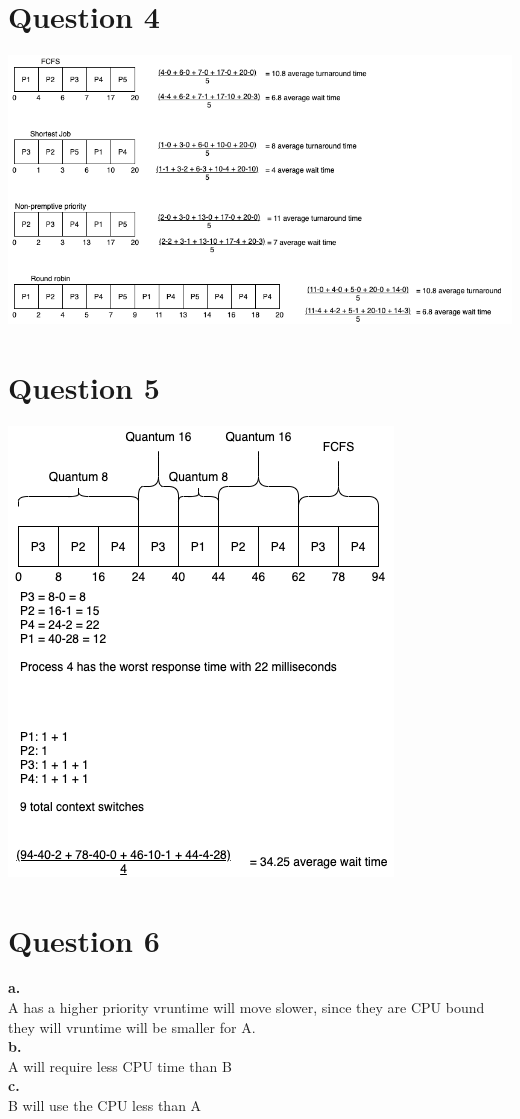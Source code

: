 \documentclass[11pt]{article}
\begin{document}
\section*{Question 4}
\includegraphics[scale=0.55]{COMS352HW4Q4.png}

\section*{Question 5}
\includegraphics[scale=0.55]{COMS352HW4Q5.png}

\section*{Question 6}
\textbf{a.}\\
A has a higher priority vruntime will move slower, since they are 
CPU bound they will vruntime will be smaller for A.\\
\textbf{b.}\\
A will require less CPU time than B\\
\textbf{c.}\\
B will use the CPU less than A
\end{document}
